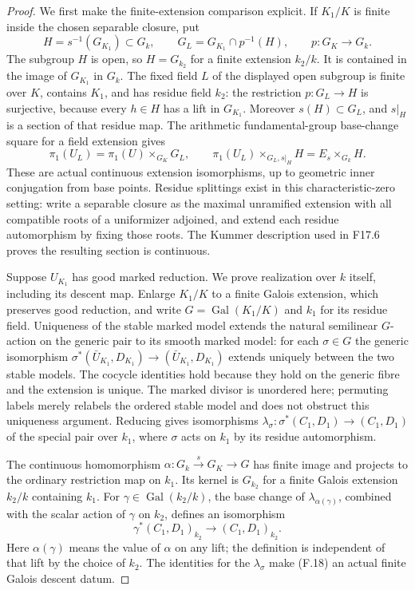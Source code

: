 \begin{proof}
We first make the finite-extension comparison explicit. If
$K_1/K$ is finite inside the chosen separable closure, put
\[
 H=s^{-1}(G_{K_1})\subset G_k,
 \qquad G_L=G_{K_1}\cap p^{-1}(H),\qquad p:G_K\to G_k.
                                                               \tag{F.16}
\]
The subgroup $H$ is open, so $H=G_{k_2}$ for a finite extension
$k_2/k$. It is contained in the image of $G_{K_1}$ in $G_k$.
The fixed field $L$ of the displayed open subgroup is finite
over $K$, contains $K_1$, and has residue field $k_2$: the
restriction $p:G_L\to H$ is surjective, because every $h\in H$
has a lift in $G_{K_1}$. Moreover $s(H)\subset G_L$, and
$s|_H$ is a section of that residue map. The arithmetic
fundamental-group base-change square for a field extension gives
\[
 \pi_1(U_L)=\pi_1(U)\times_{G_K}G_L,
 \qquad
 \pi_1(U_L)\times_{G_L,s|_H}H=E_s\times_{G_k}H.                \tag{F.17}
\]
These are actual continuous extension isomorphisms, up to
geometric inner conjugation from base points.
Residue splittings exist in this characteristic-zero setting:
write a separable closure as the maximal unramified extension
with all compatible roots of a uniformizer adjoined, and extend
each residue automorphism by fixing those roots. The Kummer
description used in F17.6 proves the resulting section is
continuous.

Suppose $U_{K_1}$ has good marked reduction. We prove realization
over $k$ itself, including its descent map. Enlarge $K_1/K$ to
a finite Galois extension, which preserves good reduction, and
write $G=\operatorname{Gal}(K_1/K)$ and $k_1$ for its residue
field. Uniqueness of the stable marked model extends the natural
semilinear $G$-action on the generic pair to its smooth marked
model: for each $\sigma\in G$ the generic isomorphism
$\sigma^*(\bar U_{K_1},D_{K_1})\to(\bar U_{K_1},D_{K_1})$
extends uniquely between the two stable models. The cocycle
identities hold because they hold on the generic fibre and the
extension is unique. The marked divisor is unordered here;
permuting labels merely relabels the ordered stable model and
does not obstruct this uniqueness argument. Reducing gives isomorphisms
$\lambda_\sigma:\sigma^*(C_1,D_1)\to(C_1,D_1)$ of the
special pair over $k_1$, where $\sigma$ acts on $k_1$ by its
residue automorphism.

The continuous homomorphism
$\alpha:G_k\xrightarrow{s}G_K\to G$ has finite image and
projects to the ordinary restriction map on $k_1$.
Its kernel is $G_{k_2}$ for a finite Galois extension $k_2/k$
containing $k_1$. For $\gamma\in\operatorname{Gal}(k_2/k)$,
the base change of $\lambda_{\alpha(\gamma)}$, combined with
the scalar action of $\gamma$ on $k_2$, defines an isomorphism
\[
 \gamma^*(C_1,D_1)_{k_2}\longrightarrow(C_1,D_1)_{k_2}.
                                                               \tag{F.18}
\]
Here $\alpha(\gamma)$ means the value of $\alpha$ on any lift;
the definition is independent of that lift by the choice of
$k_2$. The identities for the $\lambda_\sigma$ make (F.18) an
actual finite Galois descent datum.


\end{proof}
